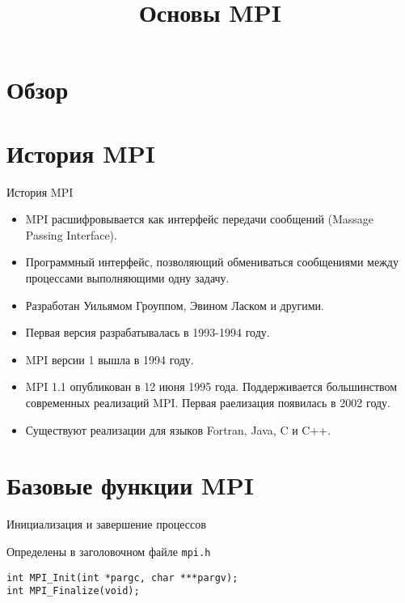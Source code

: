 

\title{Основы MPI}



\begin{frame}
\titlepage
\end{frame}

\section{Обзор}

\begin{frame}
\tableofcontents
\end{frame} 

\section{История MPI}

\begin{frame}{История MPI}

\begin{itemize}
	\item MPI расшифровывается как интерфейс передачи сообщений (\abbr Massage Passing Interface).
	\item Программный интерфейс, позволяющий обмениваться сообщениями между процессами выполняющими одну задачу.
	\item Разработан Уильямом Гроуппом, Эвином Ласком и другими.
	\item Первая версия разрабатывалась в 1993-1994 году.
	\item MPI версии 1 вышла в 1994 году.
	\item MPI 1.1 опубликован в 12 июня 1995 года. Поддерживается большинством современных реализаций MPI. Первая раелизация появилась в 2002 году.
	\item Существуют реализации для языков Fortran, Java, C и C++.
\end{itemize}

\end{frame}

\section{Базовые функции MPI}

\begin{frame}[fragile]{Инициализация и завершение процессов}

Определены в заголовочном файле \texttt{mpi.h}

\vfill

\begin{lstlisting}
int MPI_Init(int *pargc, char ***pargv);
int MPI_Finalize(void);
\end{lstlisting}

\end{frame}

